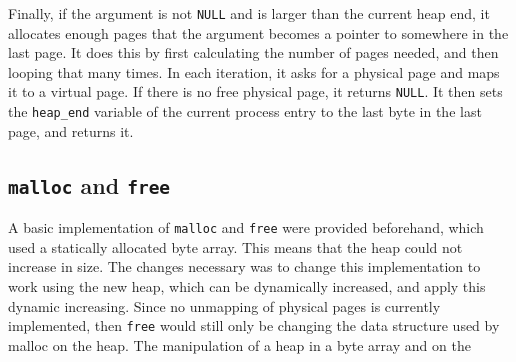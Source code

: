 \documentclass{article}
\begin{document}
Finally, if the argument is not \texttt{NULL} and is larger than the current heap end, it allocates enough pages that the argument becomes a pointer to somewhere in the last page. It does this by first calculating the number of pages needed, and then looping that many times. In each iteration, it asks for a physical page and maps it to a virtual page. If there is no free physical page, it returns \texttt{NULL}. It then sets the \texttt{heap\_end} variable of the current process entry to the last byte in the last page, and returns it.
%
\subsection{\texttt{malloc} and \texttt{free}}
%
A basic implementation of \texttt{malloc} and \texttt{free} were provided beforehand, which used a statically allocated byte array. This means that the heap could not increase in size. The changes necessary was to change this implementation to work using the new heap, which can be dynamically increased, and apply this dynamic increasing. Since no unmapping of physical pages is currently implemented, then \texttt{free} would still only be changing the data structure used by malloc on the heap. The manipulation of a heap in a byte array and on the 
\end{document}
